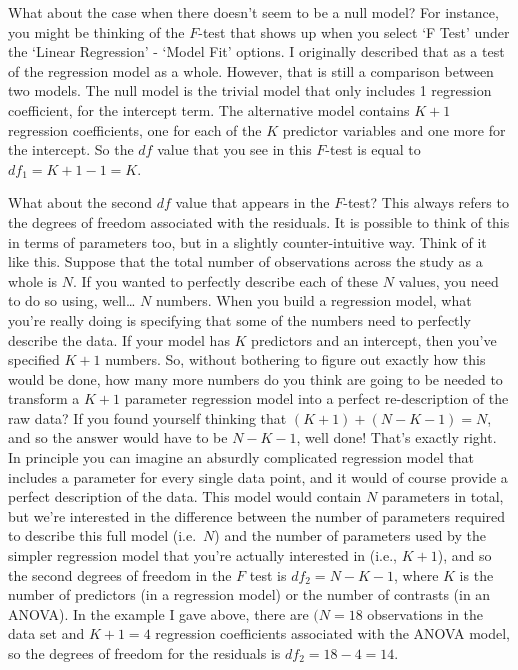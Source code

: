 \documentclass[
  a4paper,
]{book}
\begin{document}
What about the case when there doesn't seem to be a null model? For
instance, you might be thinking of the \(F\)-test that shows up when you
select `F Test' under the `Linear Regression' - `Model Fit' options. I
originally described that as a test of the regression model as a whole.
However, that is still a comparison between two models. The null model
is the trivial model that only includes 1 regression coefficient, for
the intercept term. The alternative model contains \(K + 1\) regression
coefficients, one for each of the \(K\) predictor variables and one more
for the intercept. So the \(df\) value that you see in this \(F\)-test
is equal to \(df_1 = K + 1 - 1 = K\).

What about the second \(df\) value that appears in the \(F\)-test? This
always refers to the degrees of freedom associated with the residuals.
It is possible to think of this in terms of parameters too, but in a
slightly counter-intuitive way. Think of it like this. Suppose that the
total number of observations across the study as a whole is \(N\). If
you wanted to perfectly describe each of these \(N\) values, you need to
do so using, well\ldots{} \(N\) numbers. When you build a regression
model, what you're really doing is specifying that some of the numbers
need to perfectly describe the data. If your model has \(K\) predictors
and an intercept, then you've specified \(K + 1\) numbers. So, without
bothering to figure out exactly how this would be done, how many more
numbers do you think are going to be needed to transform a \(K + 1\)
parameter regression model into a perfect re-description of the raw
data? If you found yourself thinking that \((K + 1) + (N - K - 1) = N\),
and so the answer would have to be \(N - K - 1\), well done! That's
exactly right. In principle you can imagine an absurdly complicated
regression model that includes a parameter for every single data point,
and it would of course provide a perfect description of the data. This
model would contain \(N\) parameters in total, but we're interested in
the difference between the number of parameters required to describe
this full model (i.e.~\(N\)) and the number of parameters used by the
simpler regression model that you're actually interested in (i.e.,
\(K + 1\)), and so the second degrees of freedom in the \(F\) test is
\(df_2 = N - K - 1\), where \(K\) is the number of predictors (in a
regression model) or the number of contrasts (in an ANOVA). In the
example I gave above, there are \((N = 18\) observations in the data set
and \(K + 1 = 4\) regression coefficients associated with the ANOVA
model, so the degrees of freedom for the residuals is
\(df_2 = 18 - 4 = 14\).
\end{document}
